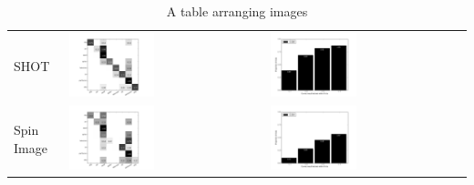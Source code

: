 \begin{table}
\begin{tabular}{m{} m{} m{}}
  SHOT & \includegraphics[width=0.45\textwidth,clip=true]{../figures/SHOT_confmat.png} & \includegraphics[width=0.45\textwidth,clip=true]{../figures/SHOT_rankhist.png} \\
  Spin Image & \includegraphics[width=0.45\textwidth,clip=true]{../figures/SPIN_IMAGE_confmat.png} & \includegraphics[width=0.45\textwidth,clip=true]{../figures/SPIN_IMAGE_rankhist.png} \\
\end{tabular}
\caption{A table arranging images}
\label{tab:gt}
\end{table}